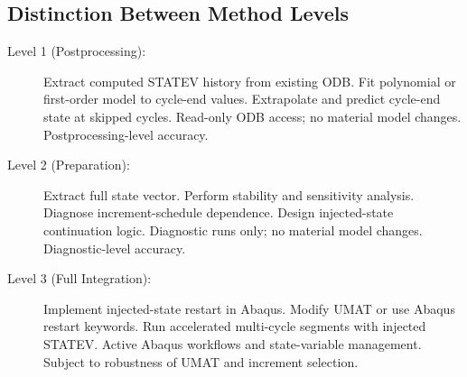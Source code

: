 \subsection{Distinction Between Method Levels}

\begin{description}
  \item[Level 1 (Postprocessing):] Extract computed STATEV history from existing ODB. Fit polynomial or first-order model to cycle-end values. Extrapolate and predict cycle-end state at skipped cycles. Read-only ODB access; no material model changes. Postprocessing-level accuracy.
  
  \item[Level 2 (Preparation):] Extract full state vector. Perform stability and sensitivity analysis. Diagnose increment-schedule dependence. Design injected-state continuation logic. Diagnostic runs only; no material model changes. Diagnostic-level accuracy.
  
  \item[Level 3 (Full Integration):] Implement injected-state restart in Abaqus. Modify UMAT or use Abaqus restart keywords. Run accelerated multi-cycle segments with injected STATEV. Active Abaqus workflows and state-variable management. Subject to robustness of UMAT and increment selection.
\end{description}

